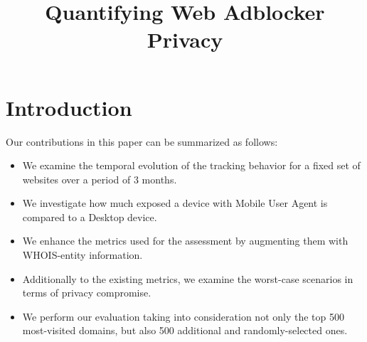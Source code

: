 \documentclass{sig-alternate}
\begin{document}
\title{Quantifying Web Adblocker Privacy}
\author{}


\maketitle

\begin{abstract}
\end{abstract}

\section{Introduction} \label{sec:introduction}

 Our contributions in this paper can be summarized as follows:
 \begin{itemize}
 \item We examine the temporal evolution of the tracking behavior for a fixed set of websites over a period of 3 months.
 \item We investigate how much exposed a device with Mobile User Agent is compared to a Desktop device.
 \item We enhance the metrics used for the assessment by augmenting them with WHOIS-entity information.
 \item Additionally to the existing metrics, we examine the worst-case scenarios in terms of privacy compromise.
 \item We perform our evaluation taking into consideration not only the top 500 most-visited domains, but also 500 additional and randomly-selected ones.
 \end{itemize}
\end{document}
